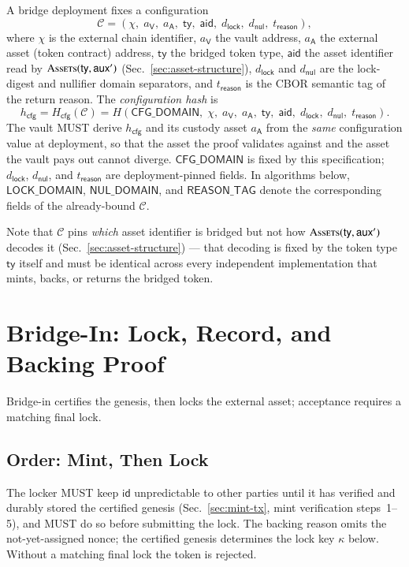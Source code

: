 A bridge deployment fixes a configuration
\[
\mathcal{C} = (\chi,\; a_\mathsf{V},\; a_\mathsf{A},\; \mathsf{ty},\; \mathsf{aid},\; d_\mathsf{lock},\; d_\mathsf{nul},\; t_\mathsf{reason}),
\]
where $\chi$ is the external chain identifier, $a_\mathsf{V}$ the vault address, $a_\mathsf{A}$ the external asset (token contract) address, $\mathsf{ty}$ the bridged token type, $\mathsf{aid}$ the asset identifier read by $\Call{Assets}{\mathsf{ty},\auxd'}$ (Sec.~\ref{sec:asset-structure}), $d_\mathsf{lock}$ and $d_\mathsf{nul}$ are the lock-digest and nullifier domain separators, and $t_\mathsf{reason}$ is the CBOR semantic tag of the return reason. The \emph{configuration hash} is
\[
h_\mathsf{cfg} = H_\mathsf{cfg}(\mathcal{C})
= H(\mathsf{CFG\_DOMAIN},\; \chi,\; a_\mathsf{V},\; a_\mathsf{A},\; \mathsf{ty},\; \mathsf{aid},\; d_\mathsf{lock},\; d_\mathsf{nul},\; t_\mathsf{reason}).
\]
The vault MUST derive $h_\mathsf{cfg}$ and its custody asset $a_\mathsf{A}$ from the \emph{same} configuration value at deployment, so that the asset the proof validates against and the asset the vault pays out cannot diverge. $\mathsf{CFG\_DOMAIN}$ is fixed by this specification; $d_\mathsf{lock}$, $d_\mathsf{nul}$, and $t_\mathsf{reason}$ are deployment-pinned fields. In algorithms below, $\mathsf{LOCK\_DOMAIN}$, $\mathsf{NUL\_DOMAIN}$, and $\mathsf{REASON\_TAG}$ denote the corresponding fields of the already-bound $\mathcal{C}$.

Note that $\mathcal{C}$ pins \emph{which} asset identifier is bridged but not how $\Call{Assets}{\mathsf{ty},\auxd'}$ decodes it (Sec.~\ref{sec:asset-structure}) --- that decoding is fixed by the token type $\mathsf{ty}$ itself and must be identical across every independent implementation that mints, backs, or returns the bridged token.

\section{Bridge-In: Lock, Record, and Backing Proof}\label{app:bridging-lock}

Bridge-in certifies the genesis, then locks the external asset; acceptance requires a matching final lock.

\subsection{Order: Mint, Then Lock}\label{app:bridging-order}

The locker MUST keep $\mathsf{id}$ unpredictable to other parties until it has verified and durably stored the certified genesis (Sec.~\ref{sec:mint-tx}, mint verification steps~1--5), and MUST do so before submitting the lock. The backing reason omits the not-yet-assigned nonce; the certified genesis determines the lock key $\kappa$ below. Without a matching final lock the token is rejected.

